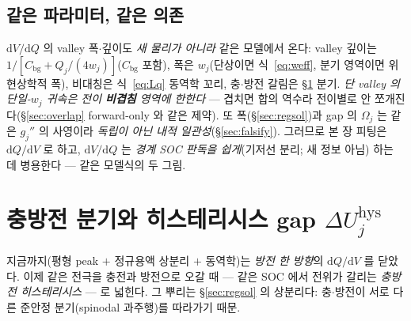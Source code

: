 \documentclass[11pt,a4paper]{article}
\newcommand{\dd}{\mathrm{d}}
\newcommand{\bg}{\mathrm{bg}}
\newcommand{\hys}{\mathrm{hys}}
\begin{document}
\subsection{같은 파라미터, 같은 의존}
$\dd V/\dd Q$ 의 valley 폭$\cdot$깊이도 \emph{새 물리가 아니라} 같은 모델에서 온다: valley 깊이는
$1/[C_\bg+Q_j/(4w_j)]$($C_\bg$ 포함), 폭은 $w_j$(단상이면 식~\eqref{eq:weff}, 분기 영역이면 위 현상학적 폭), 비대칭은
식~\eqref{eq:Lq} 동역학 꼬리, 충$\cdot$방전 갈림은 \S\ref{sec:hys_branch} 분기. \emph{단 valley 의 단일-$w_j$ 귀속은 전이
\textbf{비겹침} 영역에 한한다} — 겹치면 합의 역수라 전이별로 안 쪼개진다(\S\ref{sec:overlap} forward-only 와 같은 제약).
또 폭(\S\ref{sec:regsol})과 gap 의 $\Omega_j$ 는 같은 $g_j''$ 의 사영이라 \emph{독립이 아닌 내적 일관성}(\S\ref{sec:falsify}).
그러므로 본 장 피팅은 $\dd Q/\dd V$ 로 하고, $\dd V/\dd Q$ 는 \emph{경계 SOC 판독을 쉽게}(기저선 분리; 새 정보 아님)
하는 데 병용한다 — 같은 모델식의 두 그림.

\section{충방전 분기와 히스테리시스 gap $\Delta U_j^\hys$}\label{sec:hys_branch}
지금까지(평형 peak $+$ 정규용액 상분리 $+$ 동역학)는 \emph{방전 한 방향}의 $\dd Q/\dd V$ 를 닫았다. 이제 같은
전극을 충전과 방전으로 오갈 때 — 같은 SOC 에서 전위가 갈리는 \emph{충방전 히스테리시스} — 로 넓힌다. 그 뿌리는
\S\ref{sec:regsol} 의 상분리다: 충$\cdot$방전이 서로 다른 준안정 분기(spinodal 과주행)를 따라가기 때문.
\end{document}
